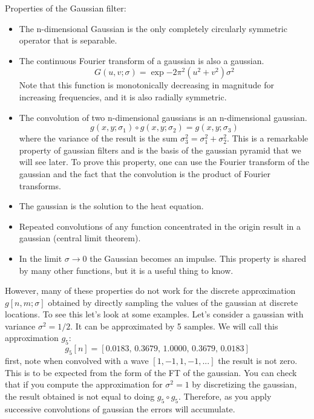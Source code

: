 Properties of the Gaussian filter:
\begin{itemize}
	\item The n-dimensional Gaussian is the only completely circularly symmetric operator that is separable.

	\item The continuous Fourier transform of a gaussian is also a gaussian.
	      \begin{equation}
		      G (u,v; \sigma) = \exp{- 2 \pi^2 (u^2 +  v^2) \sigma^2}
		      \label{eq:FTgauss2d}
	      \end{equation}
	      Note that this function is monotonically decreasing in magnitude for increasing frequencies, and it is also radially symmetric.

	\item The convolution of two n-dimensional gaussians is an n-dimensional gaussian.
	      \begin{equation}
		      g (x,y; \sigma_1 ) \circ g (x,y; \sigma_2)  = g (x,y; \sigma_3)
	      \end{equation}
	      where the variance of the result is the sum $\sigma_3^2 = \sigma_1^2 + \sigma_2^2$. This is a remarkable property of gaussian filters and is the basis of the gaussian pyramid that we will see later. To prove this property, one can use the Fourier transform of the gaussian and the fact that the convolution is the product of Fourier transforms.

	\item The gaussian is the solution to the heat equation.

	\item Repeated convolutions of any function concentrated in the origin result in a gaussian (central limit theorem).

	\item In the limit $\sigma \rightarrow 0$ the Gaussian becomes an impulse. This property is shared by many other functions, but it is a useful thing to know.
\end{itemize}

However, many of these properties do not work for the discrete approximation $g\left[n,m;\sigma \right]$ obtained by directly sampling the values of the gaussian at discrete locations. To see this let's look at some examples. Let's consider a gaussian with variance $\sigma^2=1/2$. It can be approximated by 5 samples. We will call this approximation $g_5$:
\begin{equation}
	g_5\left[ n \right] = \left[0.0183, \,    0.3679, \,    1.0000, \,    0.3679, \,    0.0183 \right]
\end{equation}
first, note when convolved with a wave $\left[1,-1,1,-1,...\right]$ the result is not zero. This is to be expected from the form of the FT of the gaussian. You can check that if you  compute the approximation for $\sigma^2=1$ by discretizing the gaussian, the result obtained is not equal to doing $g_5 \circ g_5$. Therefore, as you apply successive convolutions of gaussian the errors will accumulate.

